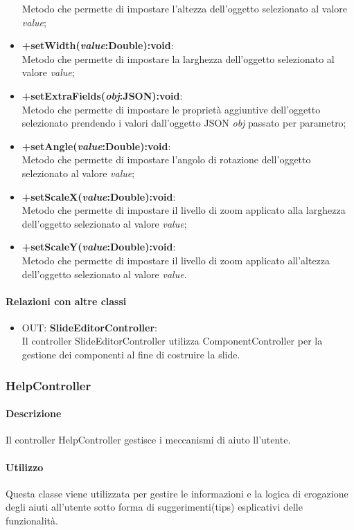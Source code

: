 \begin{itemize}
		Metodo che permette di impostare l'altezza dell'oggetto selezionato al valore \textit{value};
	\item \textbf{+setWidth(\textit{value}:Double):void}:\\
		Metodo che permette di impostare la larghezza dell'oggetto selezionato al valore \textit{value};
	\item \textbf{+setExtraFields(\textit{obj}:JSON):void}:\\
		Metodo che permette di impostare le proprietà aggiuntive dell'oggetto selezionato prendendo i valori dall'oggetto JSON \textit{obj} passato per parametro;
	\item \textbf{+setAngle(\textit{value}:Double):void}:\\
		Metodo che permette di impostare l'angolo di rotazione dell'oggetto selezionato al valore \textit{value};
	\item \textbf{+setScaleX(\textit{value}:Double):void}:\\
		Metodo che permette di impostare il livello di zoom applicato alla larghezza dell'oggetto selezionato al valore \textit{value};
	\item \textbf{+setScaleY(\textit{value}:Double):void}:\\
		Metodo che permette di impostare il livello di zoom applicato all'altezza dell'oggetto selezionato al valore \textit{value}.
	\end{itemize}
	\paragraph{Relazioni con altre classi}
	\begin{itemize}
	 \item OUT: \textbf{SlideEditorController}:\\
		Il controller SlideEditorController utilizza ComponentController per la gestione dei componenti al fine di costruire la slide.
	\end{itemize}


\subsubsection{HelpController}
      \paragraph{Descrizione}
	Il controller HelpController gestisce i meccanismi di aiuto ll'utente.
	
	\paragraph{Utilizzo}
	Questa classe viene utilizzata per gestire le informazioni e la logica di erogazione degli aiuti all'utente sotto forma di suggerimenti(tips) esplicativi delle funzionalità.
	
